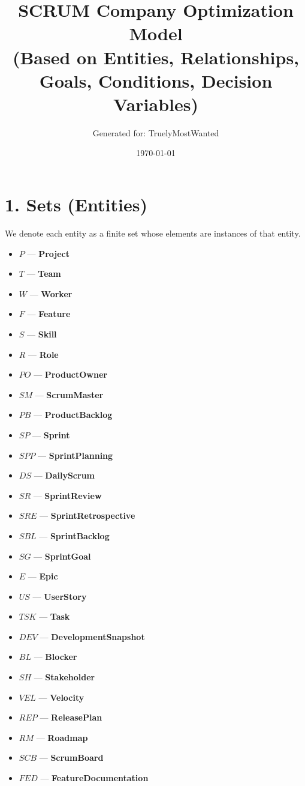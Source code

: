 \documentclass[11pt,a4paper]{article}
\title{SCRUM Company Optimization Model\\(Based on Entities, Relationships, Goals, Conditions, Decision Variables)}
\author{Generated for: TruelyMostWanted}
\date{\today}
\begin{document}
\maketitle
\tableofcontents
\newpage

\section{1. Sets (Entities)}
We denote each entity as a finite set whose elements are instances of that entity.
\begin{itemize}[leftmargin=2.2em]
  \item $P$ --- \textbf{Project}
  \item $T$ --- \textbf{Team}
  \item $W$ --- \textbf{Worker}
  \item $F$ --- \textbf{Feature}
  \item $S$ --- \textbf{Skill}
  \item $R$ --- \textbf{Role}
  \item $PO$ --- \textbf{ProductOwner}
  \item $SM$ --- \textbf{ScrumMaster}
  \item $PB$ --- \textbf{ProductBacklog}
  \item $SP$ --- \textbf{Sprint}
  \item $SPP$ --- \textbf{SprintPlanning}
  \item $DS$ --- \textbf{DailyScrum}
  \item $SR$ --- \textbf{SprintReview}
  \item $SRE$ --- \textbf{SprintRetrospective}
  \item $SBL$ --- \textbf{SprintBacklog}
  \item $SG$ --- \textbf{SprintGoal}
  \item $E$ --- \textbf{Epic}
  \item $US$ --- \textbf{UserStory}
  \item $TSK$ --- \textbf{Task}
  \item $DEV$ --- \textbf{DevelopmentSnapshot}
  \item $BL$ --- \textbf{Blocker}
  \item $SH$ --- \textbf{Stakeholder}
  \item $VEL$ --- \textbf{Velocity}
  \item $REP$ --- \textbf{ReleasePlan}
  \item $RM$ --- \textbf{Roadmap}
  \item $SCB$ --- \textbf{ScrumBoard}
  \item $FED$ --- \textbf{FeatureDocumentation}
\end{itemize}
\end{document}
